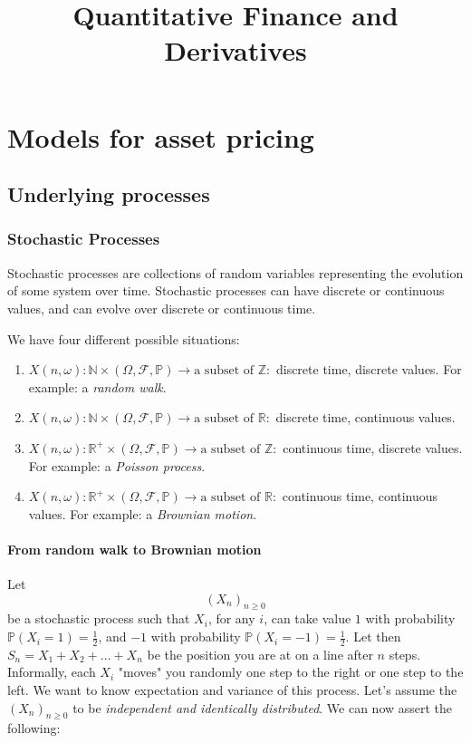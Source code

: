 \documentclass[oneside,titlepage,headinclude,12pt,a4paper,BCOR5mm,footinclude]{book}
\title{Quantitative Finance and Derivatives}
\theoremstyle{defn}
\begin{document}
\maketitle
\tableofcontents

\chapter{Models for asset pricing}

\section{Underlying processes}

  \subsection{Stochastic Processes}

  Stochastic  processes are  collections  of random  variables representing  the
  evolution of some system over time.  Stochastic processes can have discrete or
  continuous values, and can evolve over discrete or continuous time.

  We have four different possible situations:
  \begin{enumerate}
    \item \(X(n,\omega) : \mathbb{N} \times (\Omega,\mathcal{F},\mathbb{P}) \to \text{a subset of } \mathbb{Z}:\) discrete time, discrete values. For example: a \textit{random walk}.
    \item \(X(n,\omega) : \mathbb{N} \times (\Omega,\mathcal{F},\mathbb{P}) \to \text{a subset of } \mathbb{R}:\) discrete time, continuous values.
    \item \(X(n,\omega) : \mathbb{R}^+ \times (\Omega,\mathcal{F},\mathbb{P}) \to \text{a subset of } \mathbb{Z}:\) continuous time, discrete values. For example: a \textit{Poisson process}.
    \item \(X(n,\omega) : \mathbb{R}^+ \times (\Omega,\mathcal{F},\mathbb{P}) \to \text{a subset of } \mathbb{R}:\) continuous time, continuous values. For example: a \textit{Brownian motion}.
  \end{enumerate}

  \subsubsection{From random walk to Brownian motion}

  Let   $$(X_n)_{n   \geq    0}$$   be   a   stochastic    process   such   that
  \(X_i\),   for   any   \(i\),   can  take   value   \(1\)   with   probability
  \(\mathbb{P}(X_i=1)=\frac{1}{2}\),     and     \(-1\)     with     probability
  \(\mathbb{P}(X_i=-1)=\frac{1}{2}\). Let then \(S_n = X_1 + X_2 + \ldots +X_n\)
  be the  position you  are at  on a  line after  \(n\) steps.  Informally, each
  \(X_i\) "moves" you randomly one step to the right or one step to the left. We
  want  to know  expectation  and variance  of this  process.  Let's assume  the
  \((X_n)_{n \geq  0}\) to be \textit{independent  and identically distributed}.
  We can now assert the following:
\end{document}
